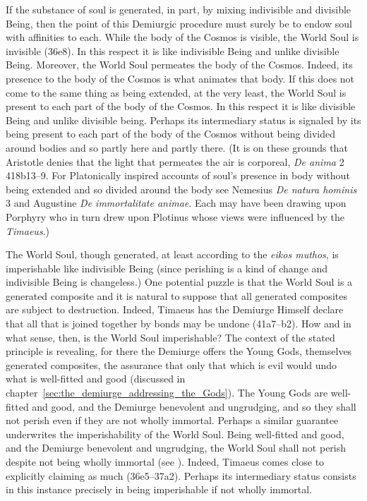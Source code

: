 If the substance of soul is generated, in part, by mixing indivisible and divisible Being, then the point of this Demiurgic procedure must surely be to endow soul with affinities to each. While the body of the Cosmos is visible, the World Soul is invisible (36e8). In this respect it is like indivisible Being and unlike divisible Being. Moreover, the World Soul permeates the body of the Cosmos. Indeed, its presence to the body of the Cosmos is what animates that body. If this does not come to the same thing as being extended, at the very least, the World Soul is present to each part of the body of the Cosmos. In this respect it is like divisible Being and unlike divisible being. Perhaps its intermediary status is signaled by its being present to each part of the body of the Cosmos without being divided around bodies and so partly here and partly there. (It is on these grounds that Aristotle denies that the light that permeates the air is corporeal, \emph{De anima} 2 418b13--9. For Platonically inspired accounts of soul's presence in body without being extended and so divided around the body see Nemesius \emph{De natura hominis} 3 and Augustine \emph{De immortalitate animae}. Each may have been drawing upon Porphyry who in turn drew upon Plotinus whose views were influenced by the \emph{Timaeus}.) 

The World Soul, though generated, at least according to the \emph{eikos muthos}, is imperishable like indivisible Being (since perishing is a kind of change and indivisible Being is changeless.) One potential puzzle is that the World Soul is a generated composite and it is natural to suppose that all generated composites are subject to destruction. Indeed, Timaeus has the Demiurge Himself declare that all that is joined together by bonds may be undone (41a7--b2). How and in what sense, then, is the World Soul imperishable? The context of the stated principle is revealing, for there the Demiurge offers the Young Gods, themselves generated composites, the assurance that only that which is evil would undo what is well-fitted and good (discussed in chapter~\ref{sec:the_demiurge_addressing_the_Gods}). The Young Gods are well-fitted and good, and the Demiurge benevolent and ungrudging, and so they shall not perish even if they are not wholly immortal. Perhaps a similar guarantee underwrites the imperishability of the World Soul. Being well-fitted and good, and the Demiurge benevolent and ungrudging, the World Soul shall not perish despite not being wholly immortal (see \citealt{Betegh:2019fq}). Indeed, Timaeus comes close to explicitly claiming as much (36e5--37a2). Perhaps its intermediary status consists in this instance precisely in being imperishable if not wholly immortal. 

